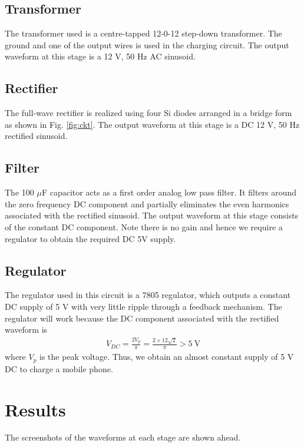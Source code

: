 \documentclass[journal,12pt,twocolumn]{IEEEtran}
\begin{document}
	\subsection{Transformer}
	The transformer used is a centre-tapped 12-0-12 step-down 
	transformer. The ground and one of the output wires is used
	in the charging circuit. The output waveform at this stage is
	a 12 V, 50 Hz AC sinusoid.
	
	\subsection{Rectifier}
	The full-wave rectifier is realized using four Si diodes arranged in a
	bridge form as shown in Fig. \ref{fig:ckt}. The output waveform at this
	stage is a DC 12 V, 50 Hz rectified sinusoid.
	
	\subsection{Filter}
	The 100 $\mu$F capacitor acts as a first order analog low pass filter. It filters
	around the zero frequency DC component and partially eliminates the
	even harmonics associated with the rectified sinusoid. The output 
	waveform at this stage consists of the constant DC component. Note
	there is no gain and hence we require a regulator to obtain the
	required DC 5V supply.
	
	\subsection{Regulator}
	The regulator used in this circuit is a 7805 regulator, which outputs
	a constant DC supply of 5 V with very little ripple through a 
	feedback mechanism. The regulator will work because the DC component 
	associated with the rectified waveform is
	\begin{align}
		V_{DC} = \frac{2V_p}{\pi} = \frac{2\times12\sqrt{2}}{\pi} > \SI{5}{\V}
	\end{align}
	where $V_p$ is the peak voltage. Thus, we obtain an almost
	constant supply of 5 V DC to charge a mobile phone.
	
	\section{Results}
	The screenshots of the waveforms at each stage are shown ahead.
	
\end{document}
